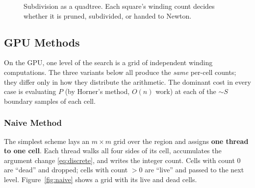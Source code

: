 \documentclass[11pt]{article}
\begin{document}
\begin{figure}[h]
\centering
{}
\caption{Subdivision as a quadtree. Each square's winding count decides whether
it is pruned, subdivided, or handed to Newton.}
\label{fig:subdiv}
\end{figure}

\subsection{GPU Methods}
On the GPU, one level of the search is a grid of independent winding
computations. The three variants below all produce the \emph{same} per-cell
counts; they differ only in how they distribute the arithmetic. The dominant
cost in every case is evaluating $P$ (by Horner's method, $O(n)$ work) at each
of the ${\sim}S$ boundary samples of each cell.

\subsubsection{Naive Method}
The simplest scheme lays an $m\times m$ grid over the region and assigns
\textbf{one thread to one cell}. Each thread walks all four sides of its cell,
accumulates the argument change \eqref{eq:discrete}, and writes the integer
count. Cells with count $0$ are ``dead'' and dropped; cells with count $>0$ are
``live'' and passed to the next level. Figure~\ref{fig:naive} shows a grid with
its live and dead cells.
\end{document}
